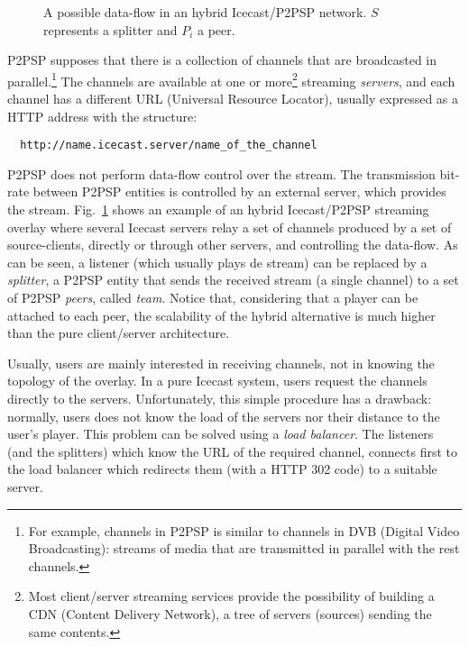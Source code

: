 
\label{sec:TTS}

\begin{figure}
   \caption{A possible data-flow in an
  hybrid Icecast/P2PSP network. $S$ represents a splitter and $P_i$ a
  peer.\label{fig:icecast-P2PSP}}
\end{figure}

P2PSP supposes that there is a collection of channels that are
broadcasted in parallel.\footnote{For example, channels in P2PSP is
  similar to channels in DVB (Digital Video Broadcasting): streams of
  media that are transmitted in parallel with the rest channels.} The
channels are available at one or more\footnote{Most client/server
  streaming services provide the possibility of building a CDN
  (Content Delivery Network), a tree of servers (sources) sending the
  same contents.} streaming \emph{servers}, and each channel has a
different URL (Universal Resource Locator), usually expressed as a
HTTP address with the structure:
\begin{verbatim}
  http://name.icecast.server/name_of_the_channel
\end{verbatim}

P2PSP does not perform data-flow control over the stream. The
transmission bit-rate between P2PSP entities is controlled by an
external server, which provides the
stream. Fig.~\ref{fig:icecast-P2PSP} shows an example of an hybrid
Icecast/P2PSP streaming overlay where several Icecast servers relay a
set of channels produced by a set of source-clients, directly or
through other servers, and controlling the data-flow. As can be seen,
a listener (which usually plays de stream) can be replaced by a
\emph{splitter}, a P2PSP entity that sends the received stream (a
single channel) to a set of P2PSP \emph{peers}, called
\emph{team}. Notice that, considering that a player can be attached to
each peer, the scalability of the hybrid alternative is much higher
than the pure client/server architecture.


Usually, users are mainly interested in receiving channels, not in
knowing the topology of the overlay. In a pure Icecast system, users
request the channels directly to the servers. Unfortunately, this
simple procedure has a drawback: normally, users does not know the
load of the servers nor their distance to the user's player. This
problem can be solved using a \emph{load balancer}. The listeners (and
the splitters) which know the URL of the required channel, connects
first to the load balancer which redirects them (with a HTTP 302 code)
to a suitable server.

